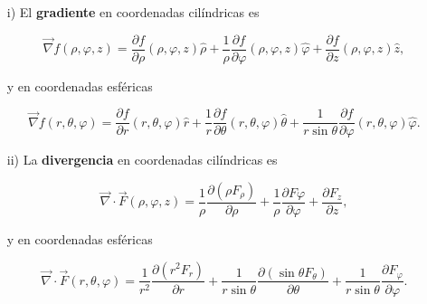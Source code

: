 \begin{itemize}
\item[i)] El \textbf{gradiente} en coordenadas cilíndricas es
\begin{shaded}
\begin{equation}
\vec{\nabla} f(\rho, \varphi,z) = \frac{\partial f}{\partial \rho} (\rho, \varphi, z) \hat{\rho} + \frac{1}{\rho}  \frac{\partial f}{\partial \varphi} (\rho, \varphi, z) \hat{\varphi} + \frac{\partial f}{\partial z} (\rho, \varphi, z) \hat{z},
\end{equation}
\end{shaded}
y en coordenadas esféricas
\begin{shaded}
\begin{equation}
\vec{\nabla} f(r, \theta,\varphi) = \frac{\partial f}{\partial r} (r, \theta, \varphi) \hat{r} + \frac{1}{r} \frac{\partial f}{\partial \theta}(r, \theta, \varphi) \hat{\theta} + \frac{1}{r\sin\theta}\frac{\partial f}{\partial \varphi}(r, \theta, \varphi) \hat{\varphi}.
\end{equation}
\end{shaded}

\item[ii)] La \textbf{divergencia} en coordenadas cilíndricas es
\begin{shaded}
\begin{equation}
\vec{\nabla} \cdot \vec{F}(\rho, \varphi,z) = \frac{1}{\rho} \frac{\partial(\rho F_{\rho})}{\partial \rho} + \frac{1}{\rho} \frac{\partial F{\varphi}}{\partial\varphi} + \frac{\partial F_z}{\partial z},
\end{equation}
\end{shaded}
y en coordenadas esféricas
\begin{shaded}
\begin{equation}
\vec{\nabla} \cdot \vec{F}(r,\theta, \varphi) = \frac{1}{r^2} \frac{\partial (r^2 F_r)}{\partial r} + \frac{1}{r\sin\theta} \frac{\partial (\sin\theta F_{\theta})}{\partial \theta} + \frac{1}{r\sin\theta} \frac{\partial F_{\varphi}}{\partial \varphi}.
\end{equation}
\end{shaded}


\end{itemize}
